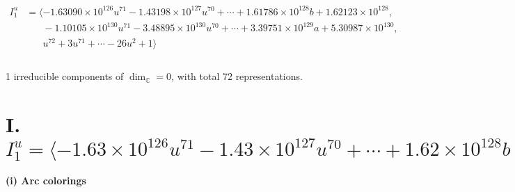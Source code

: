 \documentclass[1p]{elsarticle_modified}
\theoremstyle{definition}
\begin{document}
\begin{align*}
I^u_{1}&=\langle 
-1.63090\times10^{126} u^{71}-1.43198\times10^{127} u^{70}+\cdots+1.61786\times10^{128} b+1.62123\times10^{128},\\
\phantom{I^u_{1}}&\phantom{= \langle  }-1.10105\times10^{130} u^{71}-3.48895\times10^{130} u^{70}+\cdots+3.39751\times10^{129} a+5.30987\times10^{130},\\
\phantom{I^u_{1}}&\phantom{= \langle  }u^{72}+3 u^{71}+\cdots-26 u^2+1\rangle \\
\\
\end{align*}
\raggedright * 1 irreducible components of $\dim_{\mathbb{C}}=0$, with total 72 representations.\\
\newpage
\renewcommand{\arraystretch}{1}
\centering \section*{I. $I^u_{1}= \langle -1.63\times10^{126} u^{71}-1.43\times10^{127} u^{70}+\cdots+1.62\times10^{128} b+1.62\times10^{128},\;-1.10\times10^{130} u^{71}-3.49\times10^{130} u^{70}+\cdots+3.40\times10^{129} a+5.31\times10^{130},\;u^{72}+3 u^{71}+\cdots-26 u^2+1 \rangle$}
\flushleft \textbf{(i) Arc colorings}\\
\end{document}
